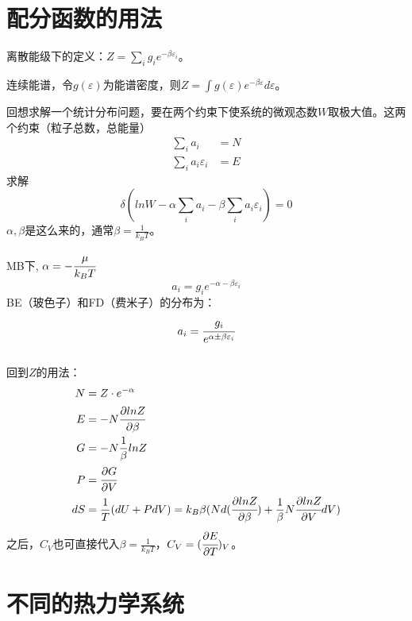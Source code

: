 \documentclass[a4paper,12pt]{article}
\begin{document}
\section{配分函数的用法}
离散能级下的定义：$Z = \sum_i g_i e^{-\beta \varepsilon_i}$。\par
连续能谱，令$g(\varepsilon)$为能谱密度，则$Z = \int g(\varepsilon) e^{- \beta \varepsilon} d\varepsilon$。\par
回想求解一个统计分布问题，要在两个约束下使系统的微观态数$W$取极大值。这两个约束（粒子总数，总能量）
\begin{subequations}
\begin{align}
\sum_i a_i &= N \\
\sum_i a_i \varepsilon_i & = E
\end{align}
\end{subequations}
求解
\begin{equation}
\delta (lnW - \alpha \sum_i a_i - \beta \sum_i a_i \varepsilon_i) = 0
\end{equation}
$\alpha, \beta$是这么来的，通常$\beta = \frac{1}{k_B T}$。\par
MB下, $\alpha = - \cfrac{\mu}{k_B T}$
\begin{equation}
a_i = g_i e^{-\alpha - \beta \varepsilon_i}
\end{equation}
BE（玻色子）和FD（费米子）的分布为：
\begin{equation}
a_i = \cfrac{g_i}{e^{\alpha \pm \beta \varepsilon_i}}
\end{equation}
\\
\indent 回到$Z$的用法：
\begin{subequations}
\begin{align}
N &= Z \cdot e^{-\alpha} \\
E &= -N \cfrac{\partial ln Z}{\partial \beta} \\
G &= -N \frac{1}{\beta} lnZ \\
P &= \cfrac{\partial G}{\partial V} \\ 
dS &= \frac{1}{T}(dU + PdV) = k_B \beta (N d(\cfrac{\partial ln Z}{\partial \beta}) + \frac{1}{\beta} N \cfrac{\partial ln Z}{\partial V} dV) \\
\end{align}
\end{subequations}
之后，$C_V$也可直接代入$\beta = \frac{1}{k_B T}$，$C_V = (\cfrac{\partial E}{\partial T})_V$。



\section{不同的热力学系统}
\end{document}
